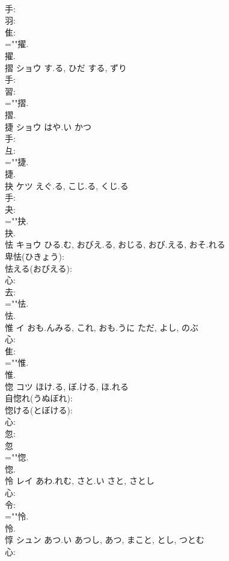 \documentclass[8pt]{extreport}
\begin{document}
\begin{CJK}{UTF8}{min}
\\	手: 
\\	羽: 
\\	隹: 
\\	=""擢.
\\	擢.
\\	摺	ショウ	す.る, ひだ	する, ずり	
\\	手: 
\\	習: 
\\	=""摺.
\\	摺.
\\	捷	ショウ	はや.い	かつ	
\\	手: 
\\	彑: 
\\	=""捷.
\\	捷.
\\	抉	ケツ	えぐ.る, こじ.る, くじ.る		
\\	手: 
\\	夬: 
\\	=""抉.
\\	抉.
\\	怯	キョウ	ひる.む, おびえ.る, おじる, おび.える, おそ.れる		
\\	卑怯(ひきょう): 
\\	怯える(おびえる): 
\\	心: 
\\	去: 
\\	=""怯.
\\	怯.
\\	惟	イ	おも.んみる, これ, おも.うに	ただ, よし, のぶ	
\\	心: 
\\	隹: 
\\	=""惟.
\\	惟.
\\	惚	コツ	ほけ.る, ぼ.ける, ほ.れる		
\\	自惚れ(うぬぼれ): 
\\	惚ける(とぼける): 
\\	心: 
\\	忽: 
\\	忽 
\\	=""惚.
\\	惚.
\\	怜	レイ	あわ.れむ, さと.い	さと, さとし	
\\	心: 
\\	令: 
\\	=""怜.
\\	怜.
\\	惇	シュン	あつ.い	あつし, あつ, まこと, とし, つとむ	
\\	心: 

\end{CJK}
\end{document}
